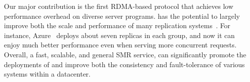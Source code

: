 
Our major contribution is the first RDMA-based \paxos protocol that achieves  
low performance overhead on diverse server programs. \xxx has the potential 
to largely improve both the scale and performance of many replication 
systems~\cite{azure:book,manos:hotdep10,crane:sosp15,rex:eurosys14, 
ssmr:dsn14,spaxos:srds12}. For instance, Azure~\cite{azure:book} 
deploys about seven replicas in each \paxos group, and now it can enjoy 
much better performance even when serving more concurrent requests. 
Overall, a fast, scalable, and general SMR service, \xxx can significantly 
promote the deployments of \paxos and improve both the consistency and 
fault-tolerance of various systems within a datacenter.




